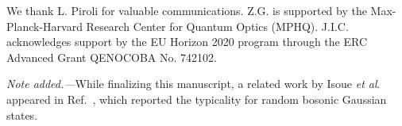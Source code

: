 \documentclass[twocolumn,english,prl,aps,superscriptaddress,amsmath,amssymb,floatfix]{revtex4-2}
\begin{document}
We thank L. Piroli for valuable communications. Z.G. is supported by the Max-Planck-Harvard Research Center for Quantum Optics (MPHQ). J.I.C. acknowledges support by the EU Horizon 2020 program through the ERC Advanced Grant QENOCOBA No. 742102.

\emph{Note added.---}While finalizing this manuscript, a related
work by Isoue \emph{et al}. appeared in Ref.~\cite{Iosue2022}, which reported the %
typicality for random bosonic Gaussian states.






\end{document}
